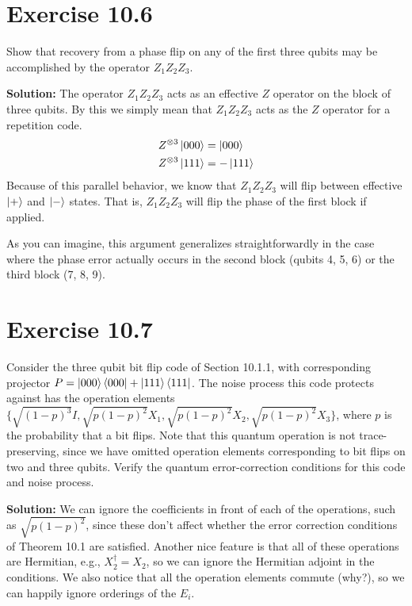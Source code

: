 \documentclass{book}
\begin{document}
\section*{Exercise 10.6}
    Show that recovery from a phase flip on any of the first three qubits may be accomplished by the operator $Z_1 Z_2 Z_3$.
    
    \textbf{Solution:} The operator $Z_1 Z_2 Z_3$ acts as an effective $Z$ operator on the block of three qubits. By this we simply mean that $Z_1 Z_2 Z_3$ acts as the $Z$ operator for a repetition code.
    \begin{align}
    \begin{aligned}
        Z^{\otimes{3}} \ket{000} &= \ket{000} \\
        Z^{\otimes{3}} \ket{111} &= - \ket{111}
    \end{aligned}
    \end{align}
    Because of this parallel behavior, we know that $Z_1 Z_2 Z_3$ will flip between effective $\ket{+}$ and $\ket{-}$ states. That is, $Z_1 Z_2 Z_3$ will flip the phase of the first block if applied.

    As you can imagine, this argument generalizes straightforwardly in the case where the phase error actually occurs in the second block (qubits 4, 5, 6) or the third block (7, 8, 9). 

\section*{Exercise 10.7}
    Consider the three qubit bit flip code of Section 10.1.1, with corresponding projector $P = \ket{000}\bra{000} + \ket{111}\bra{111}$. The noise process this code protects against has the operation elements \linebreak
    $\{\sqrt{(1-p)^3}I, \sqrt{p(1-p)^2} X_1, \sqrt{p(1-p)^2} X_2, \sqrt{p(1-p)^2} X_3\}$, where $p$ is the probability that a bit flips. Note that this quantum operation is not trace-preserving, since we have omitted operation elements corresponding to bit flips on two and three qubits. Verify the quantum error-correction conditions for this code and noise process.

    \textbf{Solution:} We can ignore the coefficients in front of each of the operations, such as $\sqrt{p(1-p)^2}$, since these don't affect whether the error correction conditions of Theorem 10.1 are satisfied. Another nice feature is that all of these operations are Hermitian, e.g., $X_2^\dagger = X_2$, so we can ignore the Hermitian adjoint in the conditions. We also notice that all the operation elements commute (why?), so we can happily ignore orderings of the $E_i$.
\end{document}
